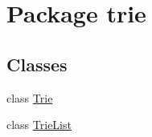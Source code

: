 \hypertarget{namespacetrie}{}\section{Package trie}
\label{namespacetrie}
\subsection*{Classes}
\begin{DoxyCompactItemize}
\item 
class \hyperlink{classtrie_1_1_trie}{Trie}
\item 
class \hyperlink{classtrie_1_1_trie_list}{Trie\+List}
\end{DoxyCompactItemize}
